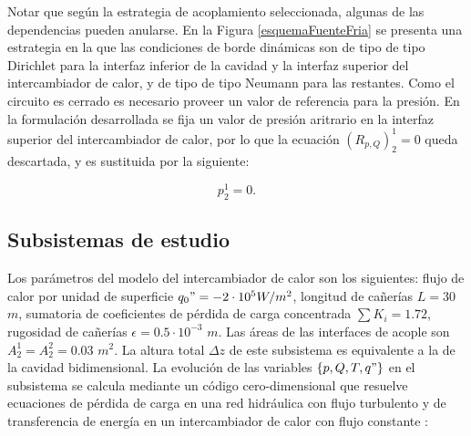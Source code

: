 Notar que según la estrategia de acoplamiento seleccionada, algunas de las dependencias pueden anularse.
En la Figura \ref{esquemaFuenteFria} se presenta una estrategia en la que las condiciones de borde dinámicas son 
de tipo de tipo Dirichlet para la interfaz inferior de la cavidad y la interfaz superior del intercambiador de calor, 
y de tipo de tipo Neumann para las restantes.
Como el circuito es cerrado es necesario proveer un valor de referencia para la presión.
En la formulación desarrollada se fija un valor de presión aritrario en la interfaz superior del intercambiador de calor,
por lo que la ecuación $(R_{p,Q})_{2}^{1}=0$ queda descartada, y es sustituida por la siguiente:

\begin{equation*}
p_2^1 = 0.
\end{equation*}

\subsection*{Subsistemas de estudio}
Los parámetros del modelo del intercambiador de calor son los siguientes:
flujo de calor por unidad de superficie $q_0"=-2\cdot 10^5 W/m^2$, 
longitud de cañerías $L=30$ $m$, 
sumatoria de coeficientes de pérdida de carga concentrada $\sum K_i=1.72$, 
rugosidad de cañerías $\epsilon=0.5\cdot 10^{-3}$ $m$.
Las áreas de las interfaces de acople son $A_2^1=A_2^2=0.03$ $m^2$.
La altura total $\Delta z$ de este subsistema es equivalente a la de la cavidad bidimensional.
La evolución de las variables $\{p,Q,T,q"\}$ en el subsistema se calcula mediante un código cero-dimensional
que resuelve ecuaciones de pérdida de carga en una red hidráulica con flujo turbulento \cite{iedelchik}
y de transferencia de energía en un intercambiador de calor con flujo constante \cite{kays}:

